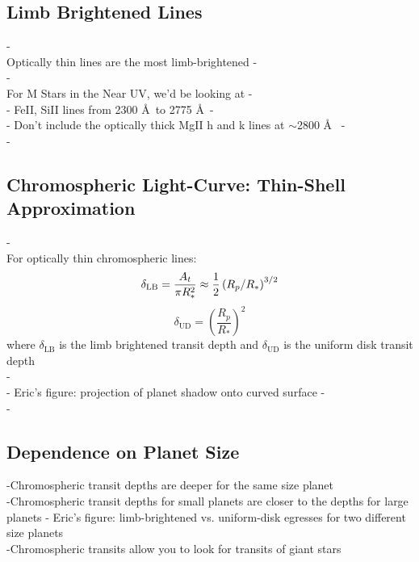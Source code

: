 \documentclass[manuscript]{aastex}
\begin{document}



\subsection{Limb Brightened Lines}
-\\
Optically thin lines are the most limb-brightened
-\\
-\\
For M Stars in the Near UV, we'd be looking at 
-\\
- FeII, SiII lines from 2300 \AA\  to 2775 \AA\ 
-\\
- Don't include the optically thick MgII h and k lines at
$\sim$2800 \AA\ \citep{2007PASP..119...67H}
-\\
-\\

\subsection{Chromospheric Light-Curve: Thin-Shell Approximation} \label{labl:chromlcurve}

-\\
For optically thin chromospheric lines:
\begin{equation}
\delta_{\mathrm{LB}} = {A_t \over \pi R_*^2} \approx \frac{1}{2}\left( R_p/R_* \right)^{3/2}
\end{equation}
\begin{equation}
\delta_{\mathrm{UD}} = \left( \frac{R_p}{R_*} \right)^2
\end{equation}
where $\delta_{\mathrm{LB}}$ is the limb brightened transit depth and
$\delta_{\mathrm{UD}}$ is the uniform disk transit depth \\
 -\\
 - Eric's figure: projection of planet shadow onto curved surface
 -\\ - \\

\subsection{Dependence on Planet Size}
-Chromospheric transit depths are deeper for the same size planet \\
-Chromospheric transit  depths for small planets are closer to the depths for large planets
 - Eric's figure: limb-brightened vs. uniform-disk egresses for two different size planets \\
-Chromospheric transits allow you to look for transits of giant stars \\
\end{document}
